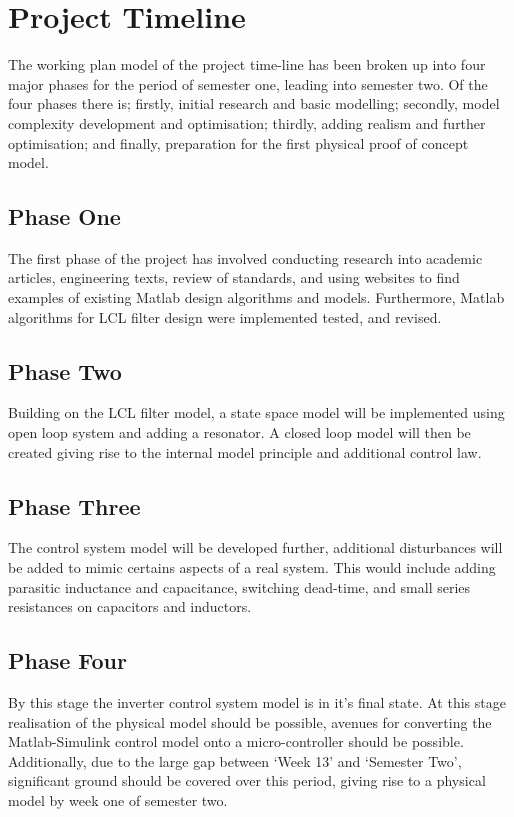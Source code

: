\chapter{Project Timeline}
The working plan model of the project time-line has been broken up into four major phases for the period of semester one, leading into semester two. Of the four phases there is; firstly, initial research and basic modelling; secondly, model complexity development and optimisation; thirdly, adding realism and further optimisation; and finally, preparation for the first physical proof of concept model.

\newpage
\section{Phase One}

The first phase of the project has involved conducting research into academic articles, engineering texts, review of standards, and using websites to find examples of existing Matlab design algorithms and models. Furthermore, Matlab algorithms for LCL filter design were implemented tested, and revised.

\section{Phase Two}

Building on the LCL filter model, a state space model will be implemented using open loop system and adding a resonator. A closed loop model will then be created giving rise to the internal model principle and additional control law.

\section{Phase Three}

The control system model will be developed further, additional disturbances will be added to mimic certains aspects of a real system. This would include adding parasitic inductance and capacitance, switching dead-time, and small series resistances on capacitors and inductors.  

\section{Phase Four}

By this stage the inverter control system model is in it's final state. At this stage realisation of the physical model should be possible, avenues for converting the Matlab-Simulink control model onto a micro-controller should be possible. Additionally, due to the large gap between `Week 13' and `Semester Two', significant ground should be covered over this period, giving rise to a physical model by week one of semester two.